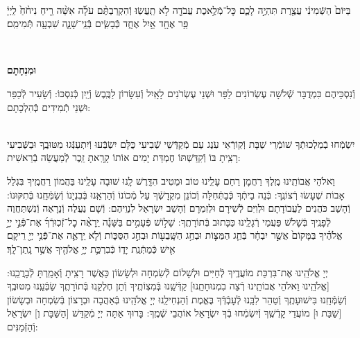 \documentclass[twoside, openany, parskip=half, 11pt]{book}
\begin{document}
\begin{sometimes}
\\
בַּיּוֹם֙ הַשְּֿׁמִינִ֔י עֲצֶ֖רֶת תִּהְיֶ֣ה לָכֶ֑ם כׇּל־מְֿלֶ֥אכֶת עֲבֹדָ֖ה לֹ֥א תַֽעֲשֽׂוּ׃ וְֿהִקְרַבְתֶּ֨ם עֹלָ֜ה אִשֵּׁ֨ה רֵ֤יחַ נִיחֹ֨חַ֙ לַֽיְיָ֔ פַּ֥ר אֶחָ֖ד אַ֣יִל אֶחָ֑ד כְּֿבָשִׂ֧ים בְּֿנֵֽי־שָׁנָ֛ה שִׁבְעָ֖ה תְּֿמִימִֽם׃

\\ \label{uminchasam}
\begin{Large}\textbf{וּמִנְחָתָם}\end{Large}
 וְֿנִסְכֵּיהֶם כִּמְדֻבָּר שְֿׁלֹשָׁה עֶשְׂרוֹנִים לַפָּר וּשְׁנֵי עֶשְׂרֹנִים לָאָֽיִל וְֿעִשָּׂרוֹן לַכֶּֽבֶשׂ וְֿיַֽיִן כְּֿנִסְכּוֹ: וְֿשָׂעִיר לְֿכַפֵּר וּשְׁנֵי תְֿמִידִים כְּֿהִלְכָתָם:

\begin{sometimes}

\shabbos\\
יִשְׂמְֿחוּ בְֿמַלְכוּתְֿךָ שׁוֹמְֿרֵי שַׁבָּת וְֿקֽוֹרְֿאֵי עֹֽנֶג עַם מְֿקַדְּֿשֵׁי שְֿׁבִיעִי כֻּלָּם יִשְׂבְּֿעוּ וְֿיִתְעַנְּֿגוּ מִטּוּבֶֽךָ וּבַשְּֿׁבִיעִי רָצִֽיתָ בּוֹ וְֿקִדַּשְׁתּוֹ חֶמְדַּת יָמִים אוֹתוֹ קָרָֽאתָ זֵֽכֶר לְֿמַעֲשֵׂה בְֿרֵאשִׁית:

\end{sometimes}

\enlargethispage{\baselineskip}
וֵאלֹהֵי אֲבוֹתֵֽינוּ מֶֽלֶךְ רַחֲמָן רַחֵם עָלֵֽינוּ טוֹב וּמֵטִיב הִדָּֽרֶשׁ לָֽנוּ שׁוּבָה עָלֵֽינוּ בַּהֲמוֹן רַחֲמֶֽיךָ בִּגְלַל אָבוֹת שֶׁעָשׂוּ רְֿצוֹנֶֽךָ: בְּֿנֵה בֵיתְֿךָ כְּֿבַתְּֿחִלָּה וְֿכוֹנֵן מִקְדָשְֿׁךָ עַל מְֿכוֹנוֹ וְֿהַרְאֵֽנוּ בְּֿבִנְיָנוֹ וְֿשַׂמְּֿחֵֽנוּ בְּֿתִקּוּנוֹ: וְֿהָשֵׁב כֹּהֲנִים לַעֲבוֹדָתָם וּלְוִיִּם לְֿשִׁירָם וּלְזִמְרָם וְֿהָשֵׁב יִשְׂרָאֵל לִנְוֵיהֶם: וְֿשָׁם נַעֲלֶה וְֿנֵרָאֶה וְֿנִשְׁתַּחֲוֶה לְֿפָנֶֽיךָ בְּֿשָׁלֹֹשׁ פַּעֲמֵי רְֿגָלֵֽינוּ כַּכָּתוּב בְּֿתוֹרָתֶֽךָ: שָׁל֣וֹשׁ פְּֿעָמִ֣ים בַּשָּׁנָ֡ה יֵֽרָאֶ֨ה כׇל־זְֿכֽוּרְֿךָ֜ אֶת־פְּֿֿנֵ֣י יְיָ֣ אֱלֹהֶ֗יךָ בַּמָּקוֹם֙ אֲשֶׁ֣ר יִבְחָ֔ר בְּֿחַ֧ג הַמַּצּ֛וֹת וּבְחַ֥ג הַשָּֽׁבֻע֖וֹת וּבְחַ֣ג הַסֻּכּ֑וֹת וְֿלֹ֧א יֵֽרָאֶ֛ה אֶת־פְּֿֿנֵ֥י יְיָ֖ רֵיקָֽם׃ אִ֖ישׁ כְּֿמַתְּֿנַֽת יָד֑וֹ כְּֿבִרְכַּ֛ת יְיָ֥ אֱלֹהֶ֖יךָ אֲשֶׁ֥ר נָֽתַן־לָֽךְ׃

 יְיָ אֱלֹהֵֽינוּ אֶת־בִּרְכַּת מוֹעֲדֶֽיךָ לְֿחַיִּים וּלְשָׁלוֹם לְֿשִׂמְחָה וּלְשָׂשׂוֹן כַּאֲשֶׁר רָצִֽיתָ וְֿאָמַֽרְתָּ לְֿבָרֲכֵֽנוּ: [\shabbos אֱלֹהֵֽינוּ וֵאלֹהֵי אֲבוֹתֵֽינוּ רְֿצֵה בִמְנוּחָתֵֽנוּ] קַדְּֿשֵֽׁנוּ בְּֿמִצְוֹתֶֽיךָ וְֿתֵן חֶלְקֵֽנוּ בְּֿתוֹרָתֶֽךָ שַׂבְּֿעֵֽנוּ מִטּוּבֶֽךָ וְֿשַׂמְּֿחֵֽנוּ בִּישׁוּעָתֶֽךָ וְֿטַהֵר לִבֵּֽנוּ לְֿעָבְֿדְּֿךָ בֶּאֱמֶת וְֿהַנְחִילֵֽנוּ יְיָ אֱלֹהֵֽינוּ בְּֿאַהֲבָה וּבְרָצוֹן בְּֿשִׂמְחָה וּבְשָׂשׂוֹן [\shabbos שַׁבַּת וּ] מוֹעֲדֵי קָדְֿשֶֽׁךָ וְֿיִשְׂמְֿחוּ בְֿךָ יִשְׂרָאֵל אוֹהֲבֵי שְֿׁמֶֽךָ: בָּרוּךְ אַתָּה יְיָ מְֿקַדֵּשׁ
[\shabbos הַשַּׁבָּת וְ] יִשְׂרָאֵל וְֿהַזְּֿמַנִּים:


\end{sometimes}
\end{document}
